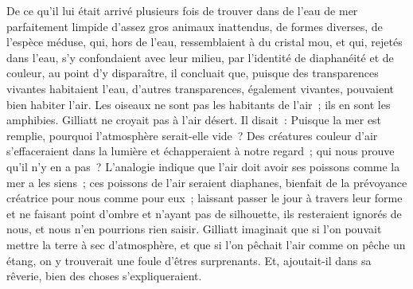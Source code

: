 \documentclass[french,twoside]{book} %
\begin{document}
De ce qu’il lui était arrivé plusieurs fois de trouver dans de l’eau de mer parfaitement limpide d’assez gros animaux inattendus, de formes diverses, de l’espèce méduse, qui, hors de l’eau, ressemblaient à du cristal mou, et qui, rejetés dans l’eau, s’y confondaient avec leur milieu, par l’identité de diaphanéité et de couleur, au point d’y disparaître, il concluait que, puisque des transparences vivantes habitaient l’eau, d’autres transparences, également vivantes, pouvaient bien habiter l’air. Les oiseaux ne sont pas les habitants de l’air ; ils en sont les amphibies. Gilliatt ne croyait pas à l’air désert. Il disait : Puisque la mer est remplie, pourquoi l’atmosphère serait-elle vide ? Des créatures couleur d’air s’effaceraient dans la lumière et échapperaient à notre regard ; qui nous prouve qu’il n’y en a pas ? L’analogie indique que l’air doit avoir ses poissons  comme la mer a les siens ; ces poissons de l’air seraient diaphanes, bienfait de la prévoyance créatrice pour nous comme pour eux ; laissant passer le jour à travers leur forme et ne faisant point d’ombre et n’ayant pas de silhouette, ils resteraient ignorés de nous, et nous n’en pourrions rien saisir. Gilliatt imaginait que si l’on pouvait mettre la terre à sec d’atmosphère, et que si l’on pêchait l’air comme on pêche un étang, on y trouverait une foule d’êtres surprenants. Et, ajoutait-il dans sa rêverie, bien des choses s’expliqueraient.\par
\end{document}

